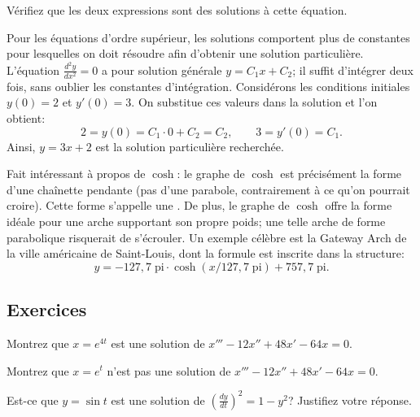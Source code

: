 \begin{exercise}
	Vérifiez que les deux expressions sont des solutions à cette équation.
\end{exercise}

\begin{example}
	Pour les équations d'ordre supérieur, les solutions comportent plus de constantes pour lesquelles on doit résoudre afin d'obtenir une solution particulière.  L'équation  $\frac{d^2y}{dx^2} = 0$ a pour solution générale $y = C_1 x + C_2$; il suffit d'intégrer deux fois, sans oublier les constantes d'intégration.  Considérons les conditions initiales $y(0) = 2$ et $y'(0) = 3$.  On substitue ces valeurs dans la solution et l'on obtient: 
	\begin{equation*}
		2 = y(0) = C_1 \cdot 0 + C_2 = C_2, \qquad
		3 = y'(0) = C_1 .
	\end{equation*}
	Ainsi, $y = 3x + 2$ est la solution particulière recherchée.
\end{example}

Fait intéressant à propos de $\cosh$:  le graphe de $\cosh$ est précisément la forme d'une cha\^inette pendante (pas d'une parabole, contrairement à ce qu'on pourrait croire).  Cette forme s'appelle une \emph{}.
De plus, le graphe de $\cosh$ offre la forme idéale pour une arche supportant son propre poids; une telle arche de forme parabolique risquerait de s'écrouler. Un exemple célèbre est la  Gateway Arch de la ville américaine de Saint-Louis, dont la formule est inscrite dans la structure:
\begin{equation*}
	y = -127,7 \; \textrm{pi} \cdot \cosh({x / 127,7  \; \textrm{pi}}) + 757,7 \;\textrm{pi} .
\end{equation*}


\subsection{Exercices}

\begin{exercise}
	Montrez que $x = e^{4t}$ est une solution de $x'''-12 x'' + 48 x' - 64 x = 0$.
\end{exercise}

\begin{exercise}
	Montrez que $x = e^{t}$ n'est pas une solution de $x'''-12 x'' + 48 x' - 64 x = 0$.
\end{exercise}

\begin{exercise}
	Est-ce que $y = \sin t$ est une solution de ${\left( \frac{dy}{dt} \right)}^2 = 1 - y^2$?
	Justifiez votre réponse.
\end{exercise}

